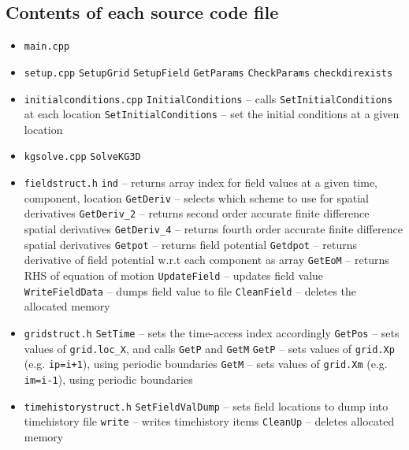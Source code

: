 \documentclass[amsmath,amssymb,12pt, eqsecnum]{revtex4}
\newcommand\codeRed[1]{\textcolor[rgb]{1,0,0}{{\tt #1}}}
\newcommand\codeBlue[1]{\textcolor[rgb]{0,0,1}{{\tt #1}}}
\begin{document}
\subsection{Contents of each source code file}
\begin{itemize}
\item \codeRed{main.cpp}
\item \codeRed{setup.cpp} 
\subitem \codeBlue{SetupGrid}
\subitem \codeBlue{SetupField}
\subitem \codeBlue{GetParams}
\subitem \codeBlue{CheckParams}
\subitem \codeBlue{checkdirexists}
\item \codeRed{initialconditions.cpp} 
\subitem \codeBlue{InitialConditions}  -- calls \codeBlue{SetInitialConditions} at each location
\subitem \codeBlue{SetInitialConditions} -- set the initial conditions at a given location
\item \codeRed{kgsolve.cpp} 
\subitem \codeBlue{SolveKG3D}
\item \codeRed{fieldstruct.h} 
\subitem \codeBlue{ind} -- returns array index for field values at a given time, component, location
\subitem \codeBlue{GetDeriv} -- selects which scheme to use for spatial derivatives
\subitem \codeBlue{GetDeriv\_2} -- returns second order accurate finite difference spatial derivatives
\subitem  \codeBlue{GetDeriv\_4} -- returns fourth order accurate finite difference spatial derivatives
\subitem \codeBlue{Getpot} -- returns field potential
\subitem \codeBlue{Getdpot} -- returns derivative of field potential w.r.t each component as array
\subitem \codeBlue{GetEoM} -- returns RHS of equation of motion
\subitem \codeBlue{UpdateField} -- updates field value
\subitem\codeBlue{WriteFieldData} -- dumps field value to file
\subitem \codeBlue{CleanField} -- deletes the allocated memory
\item \codeRed{gridstruct.h}
\subitem \codeBlue{SetTime} -- sets the time-access index accordingly
\subitem \codeBlue{GetPos} -- sets values of {\tt grid.loc\_X}, and calls \codeBlue{GetP} and  \codeBlue{GetM}
\subitem \codeBlue{GetP} -- sets values of {\tt grid.Xp} (e.g. {\tt ip=i+1}), using periodic boundaries 
\subitem \codeBlue{GetM} -- sets values of {\tt grid.Xm} (e.g. {\tt im=i-1}), using periodic boundaries 
\item \codeRed{timehistorystruct.h}
\subitem \codeBlue{SetFieldValDump} -- sets field locations to dump into timehistory file
\subitem \codeBlue{write} -- writes timehistory items
\subitem \codeBlue{CleanUp} -- deletes allocated memory
\end{itemize}



\end{document}
